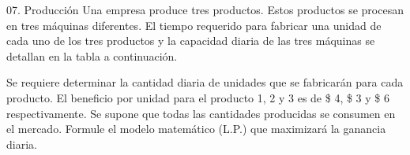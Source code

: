 \begin{frameExample}{07. Producción}{}
  Una empresa produce tres productos. Estos productos se procesan en tres máquinas diferentes. El tiempo requerido para fabricar una unidad de cada uno de los tres productos y la capacidad diaria de las tres máquinas se detallan en la tabla a continuación.

  {\centering
    \par}
  
  

   Se requiere determinar la cantidad diaria de unidades que se fabricarán para cada producto. El beneficio por unidad para el producto 1, 2 y 3 es de \$ 4, \$ 3 y \$ 6 respectivamente. Se supone que todas las cantidades producidas se consumen en el mercado. Formule el modelo matemático (L.P.) que maximizará la ganancia diaria.
\end{frameExample}



